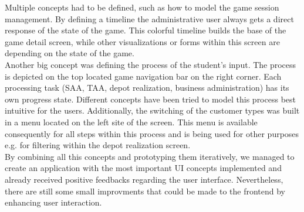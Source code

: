 Multiple concepts had to be defined, such as how to model the game session management. By defining a timeline the administrative user always gets a direct response of the state of the game. This colorful timeline builds the base of the game detail screen, while other visualizations or forms within this screen are depending on the state of the game.\\

Another big concept was defining the process of the student's input. The process is depicted on the top located game navigation bar on the right corner. Each processing task (SAA, TAA, depot realization, business administration) has its own progress state. Different concepts have been tried to model this process best intuitive for the users. Additionally, the switching of the customer types was built in a menu located on the left site of the screen. This menu is available consequently for all steps within this process and is being used for other purposes e.g. for filtering within the depot realization screen.\\

By combining all this concepts and prototyping them iteratively, we managed to create an application with the most important UI concepts implemented and already received positive feedbacks regarding the user interface. Nevertheless, there are still some small improvments that could be made to the frontend by enhancing user interaction.
